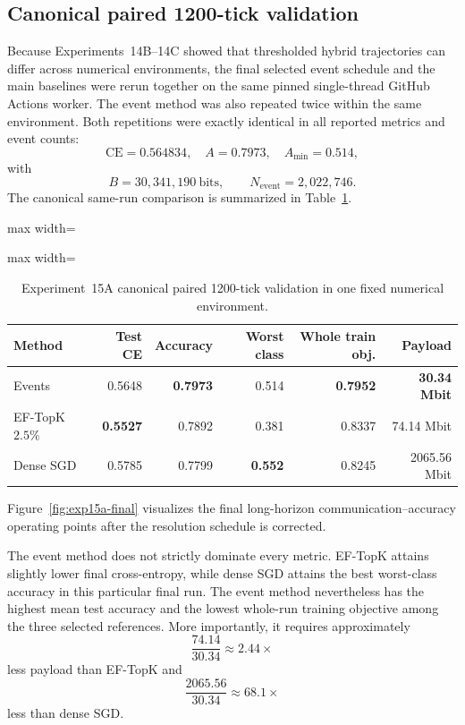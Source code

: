 \subsection{Canonical paired 1200-tick validation}

Because Experiments~14B--14C showed that thresholded hybrid trajectories can differ across numerical environments, the final selected event schedule and the main baselines were rerun together on the same pinned single-thread GitHub Actions worker. The event method was also repeated twice within the same environment. Both repetitions were exactly identical in all reported metrics and event counts:
\begin{equation}
\text{CE}=0.564834,
\quad
A=0.7973,
\quad
A_{\min}=0.514,
\end{equation}
with
\begin{equation}
B=30{,}341{,}190\ \text{bits},
\qquad
N_{\mathrm{event}}=2{,}022{,}746.
\end{equation}
The canonical same-run comparison is summarized in Table~\ref{tab:exp15a-canonical-1200}.
\begin{table}[ht]
\centering
\small
\caption{Experiment~15A canonical paired 1200-tick validation in one fixed numerical environment.}
\label{tab:exp15a-canonical-1200}
\begin{adjustbox}{max width=\textwidth}
\begin{adjustbox}{max width=\textwidth}
\begin{tabular}{lrrrrr}
\toprule
Method & Test CE & Accuracy & Worst class & Whole train obj. & Payload\\
\midrule
Events & 0.5648 & \textbf{0.7973} & 0.514 & \textbf{0.7952} & \textbf{30.34 Mbit}\\
EF-TopK $2.5\%$ & \textbf{0.5527} & 0.7892 & 0.381 & 0.8337 & 74.14 Mbit\\
Dense SGD & 0.5785 & 0.7799 & \textbf{0.552} & 0.8245 & 2065.56 Mbit\\
\bottomrule
\end{tabular}
\end{adjustbox}
\end{adjustbox}
\end{table}

Figure~\ref{fig:exp15a-final} visualizes the final long-horizon communication--accuracy operating points after the resolution schedule is corrected.

\ExpFifteenAFinalFigure

The event method does not strictly dominate every metric. EF-TopK attains slightly lower final cross-entropy, while dense SGD attains the best worst-class accuracy in this particular final run. The event method nevertheless has the highest mean test accuracy and the lowest whole-run training objective among the three selected references. More importantly, it requires approximately
\begin{equation}
\frac{74.14}{30.34}\approx\boxed{2.44\times}
\end{equation}
less payload than EF-TopK and
\begin{equation}
\frac{2065.56}{30.34}\approx\boxed{68.1\times}
\end{equation}
less than dense SGD.

